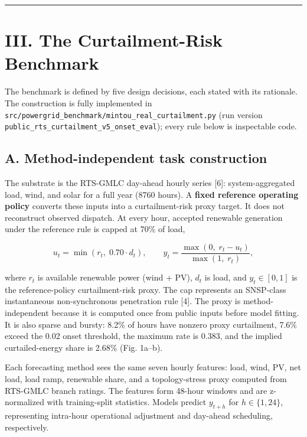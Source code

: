 \documentclass[
  10pt,
  a4paper,
]{article}
\begin{document}
\begin{center}\rule{0.5\linewidth}{0.5pt}\end{center}

\section{III. The Curtailment-Risk
Benchmark}\label{iii.-the-curtailment-risk-benchmark}

The benchmark is defined by five design decisions, each stated with its
rationale. The construction is fully implemented in
\texttt{src/powergrid\_benchmark/mintou\_real\_curtailment.py} (run
version \texttt{public\_rts\_curtailment\_v5\_onset\_eval}); every rule
below is inspectable code.

\subsection{A. Method-independent task
construction}\label{a.-method-independent-task-construction}

The substrate is the RTS-GMLC day-ahead hourly series {[}6{]}:
system-aggregated load, wind, and solar for a full year (8760 hours). A
\textbf{fixed reference operating policy} converts these inputs into a
curtailment-risk proxy target. It does not reconstruct observed
dispatch. At every hour, accepted renewable generation under the
reference rule is capped at 70\% of load,

\[
u_t = \min(r_t, \; 0.70 \cdot d_t), \qquad
y_t = \frac{\max(0, \; r_t - u_t)}{\max(1, \; r_t)},
\]

where \(r_t\) is available renewable power (wind + PV), \(d_t\) is load,
and \(y_t \in [0,1]\) is the reference-policy curtailment-risk proxy.
The cap represents an SNSP-class instantaneous non-synchronous
penetration rule {[}4{]}. The proxy is method-independent because it is
computed once from public inputs before model fitting. It is also sparse
and bursty: 8.2\% of hours have nonzero proxy curtailment, 7.6\% exceed
the 0.02 onset threshold, the maximum rate is 0.383, and the implied
curtailed-energy share is 2.68\% (Fig. 1a--b).

Each forecasting method sees the same seven hourly features: load, wind,
PV, net load, load ramp, renewable share, and a topology-stress proxy
computed from RTS-GMLC branch ratings. The features form 48-hour windows
and are z-normalized with training-split statistics. Models predict
\(y_{t+h}\) for \(h \in \{1, 24\}\), representing intra-hour operational
adjustment and day-ahead scheduling, respectively.
\end{document}
